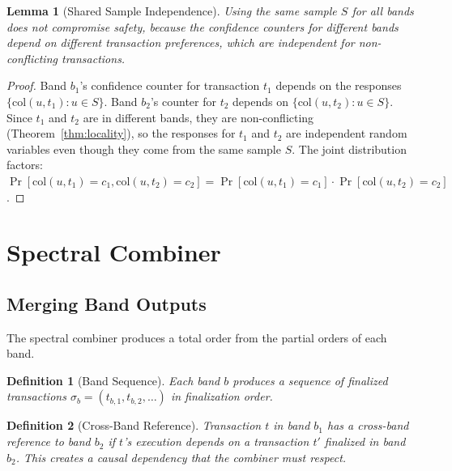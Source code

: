 \documentclass[11pt,a4paper]{article}
\newtheorem{lemma}[theorem]{Lemma}
\newtheorem{definition}{Definition}[section]
\begin{document}
\begin{lemma}[Shared Sample Independence]
\label{lem:shared-sample}
Using the same sample $S$ for all bands does not compromise safety, because the
confidence counters for different bands depend on different transaction preferences,
which are independent for non-conflicting transactions.
\end{lemma}

\begin{proof}
Band $b_1$'s confidence counter for transaction $t_1$ depends on the responses
$\{\text{col}(u, t_1) : u \in S\}$. Band $b_2$'s counter for $t_2$ depends on
$\{\text{col}(u, t_2) : u \in S\}$. Since $t_1$ and $t_2$ are in different bands,
they are non-conflicting (Theorem~\ref{thm:locality}), so the responses for $t_1$ and
$t_2$ are independent random variables even though they come from the same sample $S$.
The joint distribution factors: $\Pr[\text{col}(u, t_1) = c_1, \text{col}(u, t_2) = c_2] =
\Pr[\text{col}(u, t_1) = c_1] \cdot \Pr[\text{col}(u, t_2) = c_2]$.
\end{proof}

\section{Spectral Combiner}
\label{sec:combiner}

\subsection{Merging Band Outputs}

The spectral combiner produces a total order from the partial orders of each band.

\begin{definition}[Band Sequence]
Each band $b$ produces a sequence of finalized transactions $\sigma_b = (t_{b,1}, t_{b,2}, \ldots)$
in finalization order.
\end{definition}

\begin{definition}[Cross-Band Reference]
Transaction $t$ in band $b_1$ has a cross-band reference to band $b_2$ if $t$'s
execution depends on a transaction $t'$ finalized in band $b_2$. This creates a
causal dependency that the combiner must respect.
\end{definition}
\end{document}
